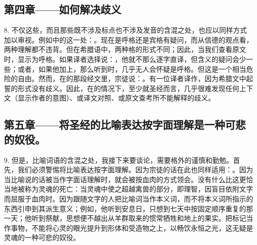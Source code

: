 
\subsection{第四章——如何解决歧义}

8. 不仅这些，而且那些既不涉及标点也不涉及发音的含混之处，也应以同样方式加以审视。例如中的这一处：。现在是呼格还是宾格有疑问，而从信德的观点看，两种理解都不违背。但在希腊语中，两种格的形式不同；因此，当我们查看原文时，显示为呼格。如果译者选择说：，他就不那么逐字直译，但含义的疑问会少一些；或者，如果他加上，那么听到时，几乎无人会怀疑是呼格。但这是一个相当危险的自由。然而，在的那段经文里，宗徒说：。有一位译者译作，因为希腊文中起誓的形式没有歧义。因此，在的情况下，至少就圣经而言，几乎很难发现任何上下文（显示作者的意图）、或译文对照、或原文查考所不能解释的歧义。\par


\subsection{第五章——将圣经的比喻表达按字面理解是一种可悲的奴役。}

9. 但是，比喻词语的含混之处，我接下来要谈论，需要格外的谨慎和勤勉。首先，我们必须警惕将比喻表达按字面理解。因为宗徒的话在此也同样适用：。因为当比喻说的话被当作字面话理解时，就会被按血肉的方式领会。没有什么比这更恰当地被称为灵魂的死亡：当灵魂中使之超越禽兽的部分，即理智，因盲目依附文字而屈服于血肉时。因为跟随文字的人把比喻词当作本义词，而不将本义词所指示的东西引申到其派生意义；例如，他听到安息日，只想到七天中按固定顺序重复的那一天；他听到祭献，思想便不越出从羊群取来的惯常牺牲和地上的果实。把标记当作事物，不能将心灵的眼光提升到形体和受造物之上，以畅饮永恒之光，这无疑是灵魂的一种可悲的奴役。\par


